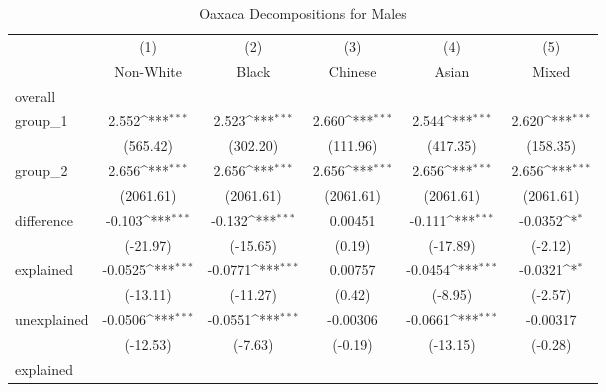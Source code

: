 {
\def\sym#1{\ifmmode^{#1}\else\(^{#1}\)\fi}
\begin{longtable}{l*{5}{c}}
\caption{Oaxaca Decompositions for Males\label{tab1}}\\
\hline\hline\endfirsthead\hline\endhead\hline\endfoot\endlastfoot
            &\multicolumn{1}{c}{(1)}&\multicolumn{1}{c}{(2)}&\multicolumn{1}{c}{(3)}&\multicolumn{1}{c}{(4)}&\multicolumn{1}{c}{(5)}\\
            &\multicolumn{1}{c}{Non-White}&\multicolumn{1}{c}{Black}&\multicolumn{1}{c}{Chinese}&\multicolumn{1}{c}{Asian}&\multicolumn{1}{c}{Mixed}\\
\hline
overall     &                     &                     &                     &                     &                     \\
group\_1     &       2.552\sym{***}&       2.523\sym{***}&       2.660\sym{***}&       2.544\sym{***}&       2.620\sym{***}\\
            &    (565.42)         &    (302.20)         &    (111.96)         &    (417.35)         &    (158.35)         \\
group\_2     &       2.656\sym{***}&       2.656\sym{***}&       2.656\sym{***}&       2.656\sym{***}&       2.656\sym{***}\\
            &   (2061.61)         &   (2061.61)         &   (2061.61)         &   (2061.61)         &   (2061.61)         \\
difference  &      -0.103\sym{***}&      -0.132\sym{***}&     0.00451         &      -0.111\sym{***}&     -0.0352\sym{*}  \\
            &    (-21.97)         &    (-15.65)         &      (0.19)         &    (-17.89)         &     (-2.12)         \\
explained   &     -0.0525\sym{***}&     -0.0771\sym{***}&     0.00757         &     -0.0454\sym{***}&     -0.0321\sym{*}  \\
            &    (-13.11)         &    (-11.27)         &      (0.42)         &     (-8.95)         &     (-2.57)         \\
unexplained &     -0.0506\sym{***}&     -0.0551\sym{***}&    -0.00306         &     -0.0661\sym{***}&    -0.00317         \\
            &    (-12.53)         &     (-7.63)         &     (-0.19)         &    (-13.15)         &     (-0.28)         \\
\hline
explained   &                     &                     &                     &                     &                     \\

\end{longtable}}
